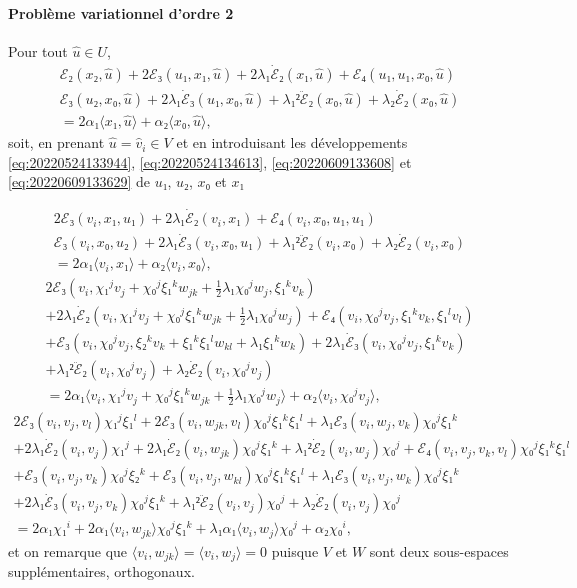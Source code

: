 \documentclass[12pt, final]{scrartcl}
\theoremstyle{definition}
\begin{document}
\paragraph{Problème variationnel d'ordre 2} Pour tout \(\hat{u} ∈ U\),
\begin{multline*}
  ℰ₂(x₂, \hat{u}) + 2ℰ₃(u₁, x₁, \hat{u}) + 2 λ₁ \dot{ℰ}₂(x₁, \hat{u}) + ℰ₄(u₁, u₁, x₀, \hat{u})\\
  ℰ₃(u₂, x₀, \hat{u}) + 2λ₁ \dot{ℰ}₃(u₁, x₀, \hat{u}) + λ₁² \ddot{ℰ}₂(x₀, \hat{u}) + λ₂ \dot{ℰ}₂(x₀, \hat{u})\\
  = 2 α₁ 〈 x₁, \hat{u} 〉 + α₂ 〈 x₀, \hat{u} 〉,
\end{multline*}
soit, en prenant \(\hat{u} = \hat{v}_i∈V\) et en introduisant les développements
\eqref{eq:20220524133944}, \eqref{eq:20220524134613}, \eqref{eq:20220609133608}
et \eqref{eq:20220609133629} de \(u₁\), \(u₂\), \(x₀ \) et \(x₁\)

\begin{multline*}
  2ℰ₃(v_i, x₁, u₁) + 2 λ₁ \dot{ℰ}₂(v_i, x₁) + ℰ₄(v_i, x₀, u₁, u₁)\\
  ℰ₃(v_i, x₀, u₂) + 2λ₁ \dot{ℰ}₃(v_i, x₀, u₁) + λ₁² \ddot{ℰ}₂(v_i, x₀) + λ₂ \dot{ℰ}₂(v_i, x₀)\\
  = 2α₁ 〈 v_i, x₁ 〉 + α₂ 〈 v_i, x₀ 〉,
\end{multline*}
\begin{multline*}
  2ℰ₃(v_i, χ₁^jv_j + χ₀^jξ₁^kw_{jk}+\tfrac{1}{2} λ₁ χ₀^j w_j, ξ₁^k v_k)\\
  + 2 λ₁ \dot{ℰ}₂(v_i, χ₁^jv_j + χ₀^jξ₁^kw_{jk}+\tfrac{1}{2} λ₁ χ₀^j w_j) + ℰ₄(v_i, χ₀^j v_j, ξ₁^k v_k, ξ₁^l v_l)\\
  + ℰ₃(v_i, χ₀^j v_j, ξ₂^k v_k + ξ₁^k ξ₁^l w_{kl} + λ₁ ξ₁^k w_k) + 2λ₁ \dot{ℰ}₃(v_i, χ₀^j v_j, ξ₁^k v_k)\\
  + λ₁² \ddot{ℰ}₂(v_i, χ₀^j v_j) + λ₂ \dot{ℰ}₂(v_i, χ₀^j v_j)\\
  = 2α₁ 〈 v_i,  χ₁^jv_j + χ₀^jξ₁^kw_{jk}+\tfrac{1}{2} λ₁ χ₀^j w_j 〉 + α₂ 〈 v_i, χ₀^j v_j〉,
\end{multline*}
\begin{multline*}
  2ℰ₃(v_i, v_j,  v_l) χ₁^j ξ₁^l + 2ℰ₃(v_i, w_{jk}, v_l) χ₀^j ξ₁^k ξ₁^l + λ₁ ℰ₃(v_i,  w_j, v_k) χ₀^j ξ₁^k\\
  + 2 λ₁ \dot{ℰ}₂(v_i, v_j) χ₁^j + 2 λ₁ \dot{ℰ}₂(v_i, w_{jk}) χ₀^j ξ₁^k+ λ₁² \dot{ℰ}₂(v_i, w_j) χ₀^j + ℰ₄(v_i, v_j,  v_k, v_l) χ₀^j ξ₁^k ξ₁^l\\
  + ℰ₃(v_i, v_j, v_k) χ₀^j ξ₂^k + ℰ₃(v_i, v_j, w_{kl}) χ₀^j ξ₁^k ξ₁^l + λ₁ ℰ₃(v_i, v_j, w_k) χ₀^j ξ₁^k\\
  + 2λ₁ \dot{ℰ}₃(v_i, v_j,  v_k) χ₀^j ξ₁^k + λ₁² \ddot{ℰ}₂(v_i, v_j) χ₀^j + λ₂ \dot{ℰ}₂(v_i, v_j) χ₀^j\\
  = 2α₁χ₁^i + 2α₁ 〈 v_i, w_{jk} 〉 χ₀^j ξ₁^k + λ₁ α₁ 〈 v_i,  w_j 〉 χ₀^j + α₂ χ₀^i,
\end{multline*}
et on remarque que \(〈 v_i, w_{jk} 〉 = 〈 v_i, w_j 〉 = 0\) puisque \(V\) et
\(W\) sont deux sous-espaces supplémentaires, orthogonaux.
\end{document}
